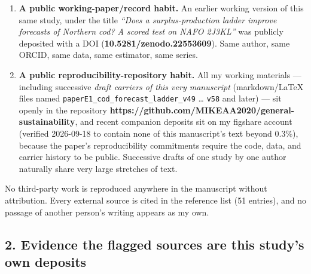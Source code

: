 \documentclass[11pt]{article}
\providecommand{\tightlist}{\setlength{\itemsep}{0.2em}\setlength{\parskip}{0pt}}
\begin{document}
\begin{enumerate}
\def\labelenumi{\arabic{enumi}.}
\tightlist
\item
  \textbf{A public working-paper/record habit.} An earlier working
  version of this same study, under the title \emph{``Does a
  surplus-production ladder improve forecasts of Northern cod? A scored
  test on NAFO 2J3KL''} was publicly deposited with a DOI
  (\textbf{10.5281/zenodo.22553609}). Same author, same ORCID, same
  data, same estimator, same series.
\item
  \textbf{A public reproducibility-repository habit.} All my working
  materials --- including successive \emph{draft carriers of this very
  manuscript} (markdown/LaTeX files named
  \texttt{paperE1\_cod\_forecast\_ladder\_v49} \ldots{} \texttt{v58} and
  later) --- sit openly in the repository
  \textbf{https://github.com/MIKEAA2020/general-sustainability}, and
  recent companion deposits sit on my figshare account (verified
  2026-09-18 to contain none of this manuscript's text beyond 0.3\%),
  because the paper's reproducibility commitments require the code,
  data, and carrier history to be public. Successive drafts of one study
  by one author naturally share very large stretches of text.
\end{enumerate}

No third-party work is reproduced anywhere in the manuscript without
attribution. Every external source is cited in the reference list (51
entries), and no passage of another person's writing appears as my own.

\subsection{2. Evidence the flagged sources are this study's own
deposits}\label{evidence-the-flagged-sources-are-this-studys-own-deposits}
\end{document}

